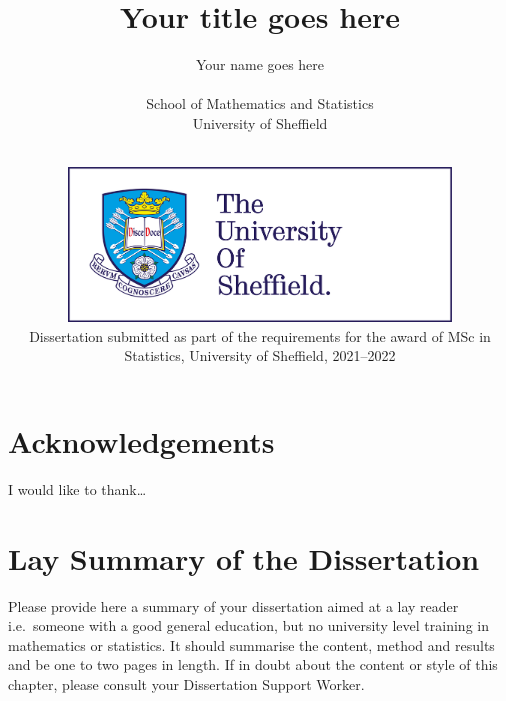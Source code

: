 \documentclass[
  12pt,
  a4paper,
  twoside]{book}
\author{}
\date{\vspace{-2.5em}}
\begin{document}


\title{Your title goes here}
\author{Your name goes here
\\$~$\vspace{0.5in}\\
School of Mathematics and Statistics\\
University of Sheffield}

\date{$~$\vspace{1.5in}\\
\includegraphics[width=4in]{figures/logo.jpg}\\
\vfill Dissertation submitted as part of the requirements for the award of MSc in Statistics, University of Sheffield, 2021--2022\\
}

\maketitle

\hypertarget{acknowledgements}{%
\chapter*{Acknowledgements}\label{acknowledgements}}

I would like to thank\ldots{}

\hypertarget{lay-summary-of-the-dissertation}{%
\chapter*{Lay Summary of the Dissertation}\label{lay-summary-of-the-dissertation}}

Please provide here a summary of your dissertation aimed at a lay reader i.e.~someone with a good general education, but no university level training in mathematics or statistics. It should summarise the content, method and results and be one to two pages in length. If in doubt about the content or style of this chapter, please consult your Dissertation Support Worker.
\end{document}
